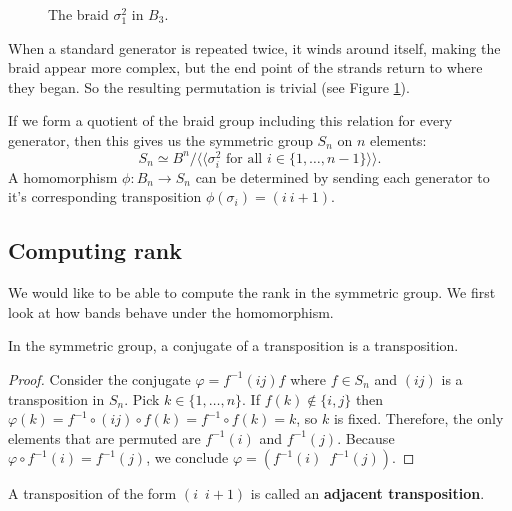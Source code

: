 \documentclass[12pt]{thesis}
\begin{document}
\begin{figure}[h]
    \centering
    \def\svgwidth{4cm}
    
    \caption{The braid $\sigma_{1}^{2}$ in $B_{3}$.}
    \label{fig:generator-squared}
\end{figure}

When a standard generator is repeated twice, it winds around
itself, making the braid appear more complex,
but the end point of the strands return to where they began.
So the resulting  permutation is trivial
(see Figure \ref{fig:generator-squared}).

If we form a quotient of the braid group including this relation for every generator, then this gives us the symmetric
group $S_{n}$ on $n$ elements:
\begin{equation}
S_{n} \simeq B^{n} / \langle \langle \sigma_{i}^{2} \text{ for all } i \in \{ 1, \ldots, n-1 \}  \rangle \rangle.
\end{equation}
A homomorphism $\phi \colon B_{n} \rightarrow S_{n}$ can be determined by 
sending each generator to it's corresponding transposition $\phi(\sigma_{i}) = (i\ i+1)$.

\subsection{Computing rank}

We would like to be able to compute the rank in the symmetric
group. We first look at how bands behave under the homomorphism.

\begin{lemma}
    In the symmetric group, a conjugate of a transposition is a transposition.
\end{lemma}

\begin{proof}
    Consider the conjugate $\varphi = f^{-1}(i j)f$
    where $f \in S_{n}$ and $(i j)$ is a transposition in $S_{n}$.
    Pick $k \in \{ 1, \ldots, n \}$. 
    If $f(k) \not \in \{ i, j \}$
    then $\varphi(k) = f^{-1} \circ (i j) \circ f(k) = f^{-1} \circ f(k) = k$,
    so $k$ is fixed.
    Therefore, the only elements that are permuted
    are $f^{-1}(i)$ and $f^{-1}(j)$.
    Because $\varphi \circ f^{-1}(i) = f^{-1}(j)$,
    we conclude $\varphi = (f^{-1}(i)\enspace f^{-1}(j))$.
\end{proof}

\begin{definition}
    A transposition of the form $(i\enspace i+1)$ is called an \textbf{adjacent transposition}.
\end{definition}
\end{document}
